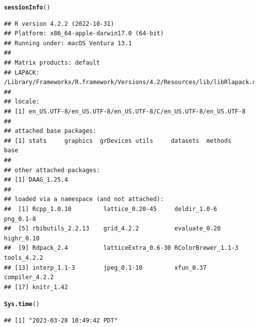 \documentclass{article}\usepackage[]{graphicx}\usepackage[]{xcolor}
\makeatletter
\newcommand{\hlstd}[1]{\textcolor[rgb]{0.345,0.345,0.345}{#1}}%
\newcommand{\hlkwd}[1]{\textcolor[rgb]{0.737,0.353,0.396}{\textbf{#1}}}%
\newenvironment{kframe}{%
 \def\at@end@of@kframe{}%
 \ifinner\ifhmode%
  \def\at@end@of@kframe{\end{minipage}}%
  \begin{minipage}{\columnwidth}%
 \fi\fi%
 \def\FrameCommand##1{\hskip\@totalleftmargin \hskip-\fboxsep
 \colorbox{shadecolor}{##1}\hskip-\fboxsep
     \hskip-\linewidth \hskip-\@totalleftmargin \hskip\columnwidth}%
 \MakeFramed {\advance\hsize-\width
   \@totalleftmargin\z@ \linewidth\hsize
   \@setminipage}}%
 {\par\unskip\endMakeFramed%
 \at@end@of@kframe}
\newenvironment{knitrout}{}{} %
\makeatother
\begin{document}
\begin{knitrout}
\color{fgcolor}\begin{kframe}
\begin{alltt}
\hlkwd{sessionInfo}\hlstd{()}
\end{alltt}
\begin{verbatim}
## R version 4.2.2 (2022-10-31)
## Platform: x86_64-apple-darwin17.0 (64-bit)
## Running under: macOS Ventura 13.1
## 
## Matrix products: default
## LAPACK: /Library/Frameworks/R.framework/Versions/4.2/Resources/lib/libRlapack.dylib
## 
## locale:
## [1] en_US.UTF-8/en_US.UTF-8/en_US.UTF-8/C/en_US.UTF-8/en_US.UTF-8
## 
## attached base packages:
## [1] stats     graphics  grDevices utils     datasets  methods   base     
## 
## other attached packages:
## [1] DAAG_1.25.4
## 
## loaded via a namespace (and not attached):
##  [1] Rcpp_1.0.10         lattice_0.20-45     deldir_1.0-6        png_0.1-8          
##  [5] rbibutils_2.2.13    grid_4.2.2          evaluate_0.20       highr_0.10         
##  [9] Rdpack_2.4          latticeExtra_0.6-30 RColorBrewer_1.1-3  tools_4.2.2        
## [13] interp_1.1-3        jpeg_0.1-10         xfun_0.37           compiler_4.2.2     
## [17] knitr_1.42
\end{verbatim}
\begin{alltt}
\hlkwd{Sys.time}\hlstd{()}
\end{alltt}
\begin{verbatim}
## [1] "2023-03-28 10:49:42 PDT"
\end{verbatim}
\end{kframe}
\end{knitrout}
\end{document}
